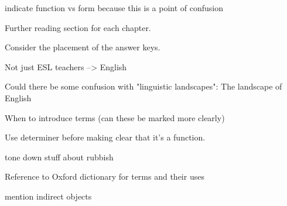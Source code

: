 indicate function vs form because this is a point of confusion

Further reading section for each chapter.

Consider the placement of the answer keys.

Not just ESL teachers --> English

Could there be some confusion with "linguistic landscapes": The landscape of English

When to introduce terms (can these be marked more clearly)

Use determiner before making clear that it's a function.

tone down stuff about rubbish

Reference to Oxford dictionary for terms and their uses

mention indirect objects